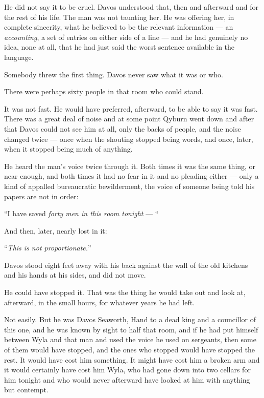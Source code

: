 He did not say it to be cruel. Davos understood that, then and afterward and for the rest of his life. The man was not taunting her. He was offering her, in complete sincerity, what he believed to be the relevant information — an \textit{accounting}, a set of entries on either side of a line — and he had genuinely no idea, none at all, that he had just said the worst sentence available in the language.

Somebody threw the first thing. Davos never saw what it was or who.

\sceneBreak

There were perhaps sixty people in that room who could stand.

It was not fast. He would have preferred, afterward, to be able to say it was fast. There was a great deal of noise and at some point Qyburn went down and after that Davos could not see him at all, only the backs of people, and the noise changed twice — once when the shouting stopped being words, and once, later, when it stopped being much of anything.

He heard the man’s voice twice through it. Both times it was the same thing, or near enough, and both times it had no fear in it and no pleading either — only a kind of appalled bureaucratic bewilderment, the voice of someone being told his papers are not in order:

“I have saved \textit{forty men in this room tonight} — “

And then, later, nearly lost in it:

“\textit{This is not proportionate.}”

Davos stood eight feet away with his back against the wall of the old kitchens and his hands at his sides, and did not move.

\sceneBreak

He could have stopped it. That was the thing he would take out and look at, afterward, in the small hours, for whatever years he had left.

Not easily. But he was Davos Seaworth, Hand to a dead king and a councillor of this one, and he was known by sight to half that room, and if he had put himself between Wyla and that man and used the voice he used on sergeants, then some of them would have stopped, and the ones who stopped would have stopped the rest. It would have cost him something. It might have cost him a broken arm and it would certainly have cost him Wyla, who had gone down into two cellars for him tonight and who would never afterward have looked at him with anything but contempt.

